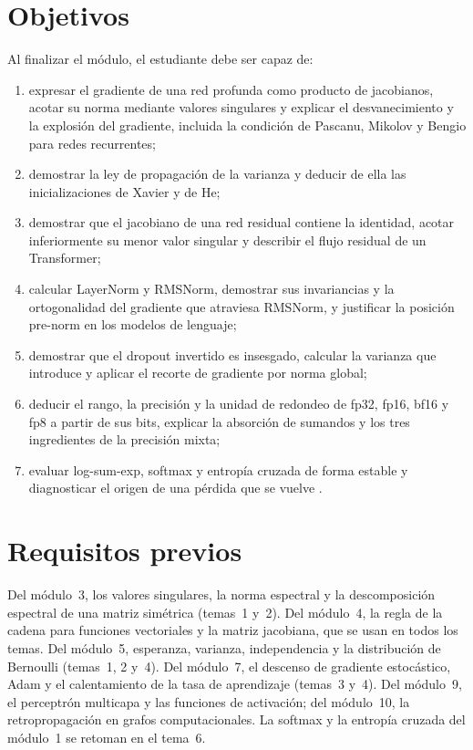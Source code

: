 \documentclass[11pt,a4paper,twoside,openany]{book}
\newcommand{\NaN}{\text{\fontseries{m}\ttfamily NaN}}
\begin{document}
\section*{Objetivos}
Al finalizar el módulo, el estudiante debe ser capaz de:
\begin{enumerate}[label=\arabic*.]
  \item expresar el gradiente de una red profunda como producto de jacobianos, acotar su norma mediante valores singulares y explicar el desvanecimiento y la explosión del gradiente, incluida la condición de Pascanu, Mikolov y Bengio para redes recurrentes;
  \item demostrar la ley de propagación de la varianza y deducir de ella las inicializaciones de Xavier y de He;
  \item demostrar que el jacobiano de una red residual contiene la identidad, acotar inferiormente su menor valor singular y describir el flujo residual de un Transformer;
  \item calcular LayerNorm y RMSNorm, demostrar sus invariancias y la ortogonalidad del gradiente que atraviesa RMSNorm, y justificar la posición pre-norm en los modelos de lenguaje;
  \item demostrar que el dropout invertido es insesgado, calcular la varianza que introduce y aplicar el recorte de gradiente por norma global;
  \item deducir el rango, la precisión y la unidad de redondeo de fp32, fp16, bf16 y fp8 a partir de sus bits, explicar la absorción de sumandos y los tres ingredientes de la precisión mixta;
  \item evaluar log-sum-exp, softmax y entropía cruzada de forma estable y diagnosticar el origen de una pérdida que se vuelve \NaN.
\end{enumerate}

\section*{Requisitos previos}
Del módulo~3, los valores singulares, la norma espectral y la descomposición espectral de una matriz simétrica (temas~1 y~2). Del módulo~4, la regla de la cadena para funciones vectoriales y la matriz jacobiana, que se usan en todos los temas. Del módulo~5, esperanza, varianza, independencia y la distribución de Bernoulli (temas~1, 2 y~4). Del módulo~7, el descenso de gradiente estocástico, Adam y el calentamiento de la tasa de aprendizaje (temas~3 y~4). Del módulo~9, el perceptrón multicapa y las funciones de activación; del módulo~10, la retropropagación en grafos computacionales. La softmax y la entropía cruzada del módulo~1 se retoman en el tema~6.
\end{document}
